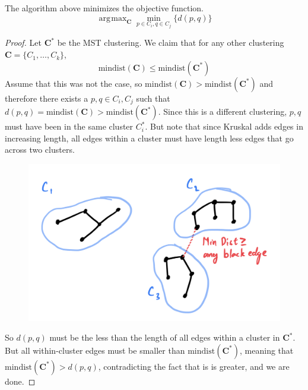 \documentclass{article}
\DeclareMathOperator*{\argmax}{\arg\!\max}
\begin{document}
      \begin{theorem}
        The algorithm above minimizes the objective function. 
        \begin{equation}
          \argmax_{\mathbf{C}} \min_{p \in C_i, q \in C_j} \{ d(p, q) \}
        \end{equation}
      \end{theorem}
      \begin{proof}
        Let $\mathbf{C}^\ast$ be the MST clustering. We claim that for any other clustering $\mathbf{C} = \{C_1, \ldots, C_k\}$,  
        \begin{equation}
          \mathrm{min dist}(\mathbf{C}) \leq \mathrm{min dist}(\mathbf{C}^{\ast})
        \end{equation}
        Assume that this was not the case, so $\mathrm{min dist}(\mathbf{C}) > \mathrm{min dist}(\mathbf{C}^{\ast})$ and therefore there exists a $p, q \in C_i, C_j$ such that $d(p, q) = \mathrm{mindist}(\mathbf{C}) > \mathrm{min dist}(\mathbf{C}^\ast)$. Since this is a different clustering, $p, q$ must have been in the same cluster $C_i^\ast$. But note that since Kruskal adds edges in increasing length, all edges within a cluster must have length less edges that go across two clusters. 

        \begin{figure}[H]
          \centering 
          \includegraphics[scale=0.4]{img/mindist.png}
          \label{fig:mindist}
        \end{figure}

        So $d(p, q)$ must be the less than the length of all edges within a cluster in $\mathbf{C}^\ast$. But all within-cluster edges must be smaller than $\mathrm{min dist}(\mathbf{C}^\ast)$, meaning that $\mathrm{min dist}(\mathbf{C}^\ast) > d(p, q)$, contradicting the fact that is is greater, and we are done. 
      \end{proof}
\end{document}
